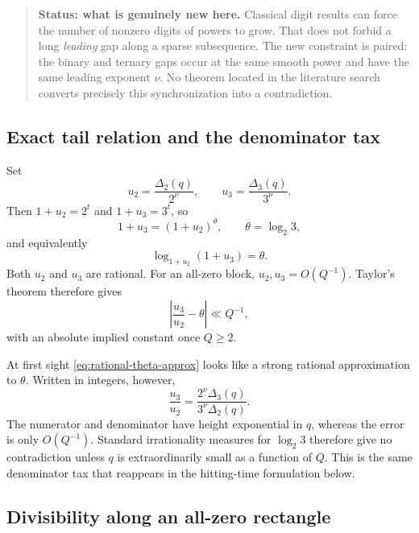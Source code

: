 \documentclass[11pt]{article}
\theoremstyle{definition}
\theoremstyle{remark}
\newenvironment{statusbox}[1]
{\begin{quote}\small\noindent\textbf{Status: #1.}\quad}
{\end{quote}}
\begin{document}
\begin{statusbox}{what is genuinely new here}
Classical digit results can force the number of nonzero digits of powers to grow.
That does not forbid a long \emph{leading} gap along a sparse subsequence.  The new
constraint is paired: the binary and ternary gaps occur at the same smooth power and
have the same leading exponent $\nu$.  No theorem located in the literature search
converts precisely this synchronization into a contradiction.
\end{statusbox}

\subsection{Exact tail relation and the denominator tax}

Set
\begin{equation}\label{eq:u2-u3}
 u_2=\frac{\Delta_2(q)}{2^\nu},
 \qquad
 u_3=\frac{\Delta_3(q)}{3^\nu}.
\end{equation}
Then $1+u_2=2^t$ and $1+u_3=3^t$, so
\begin{equation}\label{eq:tail-power-relation}
 1+u_3=(1+u_2)^{\theta},
 \qquad
 \theta=\log_2 3,
\end{equation}
and equivalently
\begin{equation}\label{eq:tail-log-ratio}
 \log_{1+u_2}(1+u_3)=\theta.
\end{equation}
Both $u_2$ and $u_3$ are rational.  For an all-zero block,
$u_2,u_3=O(Q^{-1})$.  Taylor's theorem therefore gives
\begin{equation}\label{eq:rational-theta-approx}
 \left|
  \frac{u_3}{u_2}-\theta
 \right|\ll Q^{-1},
\end{equation}
with an absolute implied constant once $Q\ge2$.

At first sight \eqref{eq:rational-theta-approx} looks like a strong rational
approximation to $\theta$.  Written in integers, however,
\begin{equation}\label{eq:theta-approximant-integers}
 \frac{u_3}{u_2}
 =\frac{2^\nu\Delta_3(q)}{3^\nu\Delta_2(q)}.
\end{equation}
The numerator and denominator have height exponential in $q$, whereas the error is
only $O(Q^{-1})$.  Standard irrationality measures for $\log_2 3$ therefore give
no contradiction unless $q$ is extraordinarily small as a function of $Q$.  This
is the same denominator tax that reappears in the hitting-time formulation below.

\subsection{Divisibility along an all-zero rectangle}
\end{document}
